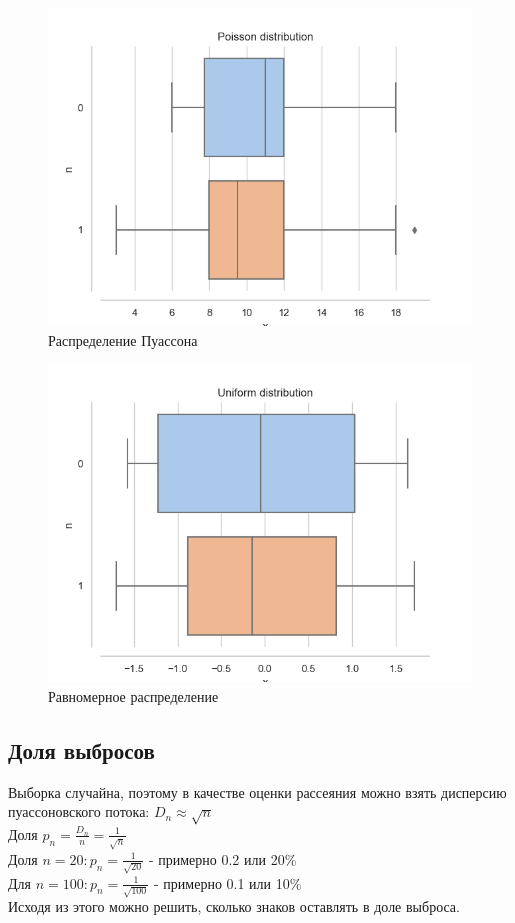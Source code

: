 \documentclass[a4paper,14pt]{article}
\begin{document}
	\begin{figure}[H]
		\centering
		\includegraphics[scale=0.6]{../image/lab3/lab3_poisson.png}
		\caption{Распределение Пуассона}
		\label{fig:poisson}
	\end{figure}
	
	\begin{figure}[H]
		\centering
		\includegraphics[scale=0.6]{../image/lab3/lab3_uniform.png}
		\caption{Равномерное распределение}
		\label{fig:uniform}
	\end{figure}
	\subsection{Доля выбросов}
	Выборка случайна, поэтому в качестве оценки рассеяния можно взять дисперсию пуассоновского потока:  $D_n \approx \sqrt{n}$\\
	Доля $p_n = \frac{D_n}{n}=\frac{1}{\sqrt{n}}$\\
	Доля $n=20: p_n=\frac{1}{\sqrt{20}}$ - примерно 0.2 или 20\% \\
	Для $n=100: p_n=\frac{1}{\sqrt{100}}$ - примерно 0.1 или 10\% \\
	Исходя из этого можно решить, сколько знаков оставлять в доле выброса.
	
\end{document}
